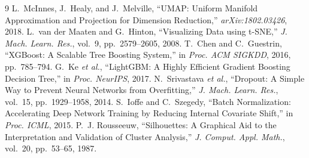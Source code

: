 \documentclass[conference]{IEEEtran}
\begin{document}
\begin{thebibliography}{9}
 L.~McInnes, J.~Healy, and J.~Melville, ``UMAP: Uniform Manifold
Approximation and Projection for Dimension Reduction,'' \emph{arXiv:1802.03426}, 2018.
 L.~van der Maaten and G.~Hinton, ``Visualizing Data using t-SNE,''
\emph{J. Mach. Learn. Res.}, vol.~9, pp.~2579--2605, 2008.
 T.~Chen and C.~Guestrin, ``XGBoost: A Scalable Tree Boosting
System,'' in \emph{Proc. ACM SIGKDD}, 2016, pp.~785--794.
 G.~Ke \emph{et al.}, ``LightGBM: A Highly Efficient Gradient
Boosting Decision Tree,'' in \emph{Proc. NeurIPS}, 2017.
 N.~Srivastava \emph{et al.}, ``Dropout: A Simple Way to Prevent
Neural Networks from Overfitting,'' \emph{J. Mach. Learn. Res.}, vol.~15,
pp.~1929--1958, 2014.
 S.~Ioffe and C.~Szegedy, ``Batch Normalization: Accelerating Deep
Network Training by Reducing Internal Covariate Shift,'' in \emph{Proc. ICML}, 2015.
 P.~J. Rousseeuw, ``Silhouettes: A Graphical Aid to the
Interpretation and Validation of Cluster Analysis,'' \emph{J. Comput. Appl. Math.},
vol.~20, pp.~53--65, 1987.
\end{thebibliography}
\end{document}
